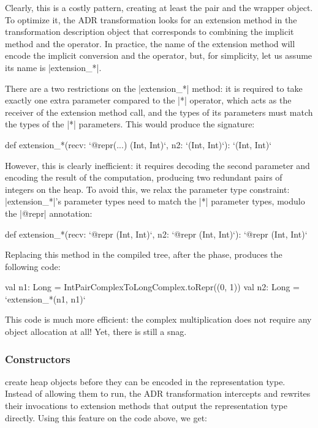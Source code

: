 Clearly, this is a costly pattern, creating at least the pair and the wrapper object. To optimize it, the ADR transformation looks for an extension method in the transformation description object that corresponds to combining the implicit method and the operator. In practice, the name of the extension method will encode the implicit conversion and the operator, but, for simplicity, let us assume its name is |extension_*|.

There are a two restrictions on the |extension_*| method: it is required to take exactly one extra parameter compared to the |*| operator, which acts as the receiver of the extension method call, and the types of its parameters must match the types of the |*| parameters. This would produce the signature:

\begin{lstlisting-nobreak}
def extension_*(recv: `@repr(...) (Int, Int)`, n2: `(Int, Int)`): `(Int, Int)`
\end{lstlisting-nobreak}

However, this is clearly inefficient: it requires decoding the second parameter and encoding the result of the computation, producing two redundant pairs of integers on the heap. To avoid this, we relax the parameter type constraint: |extension_*|'s parameter types need to match the |*| parameter types, modulo the |@repr| annotation:

\begin{lstlisting-nobreak}
def extension_*(recv: `@repr (Int, Int)`,  n2: `@repr (Int, Int)`): `@repr (Int, Int)`
\end{lstlisting-nobreak}

Replacing this method in the compiled tree, after the \commit{} phase, produces the following code:

\begin{lstlisting-nobreak}
val n1: Long = IntPairComplexToLongComplex.toRepr((0, 1))
val n2: Long = `extension_*(n1, n1)`
\end{lstlisting-nobreak}

This code is much more efficient: the complex multiplication does not require any object allocation at all! Yet, there is still a snag.

\subsubsection{Constructors} create heap objects before they can be encoded in the representation type. Instead of allowing them to run, the ADR transformation intercepts and rewrites their invocations to extension methods that output the representation type directly. Using this feature on the code above, we get:

